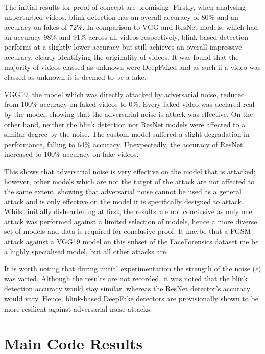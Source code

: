 The initial results for proof of concept are promising. Firstly, when analysing unperturbed videos, blink detection has an overall accuracy of 80\% and an accuracy on fakes of 72\%. In comparison to VGG and ResNet models, which had an accuracy 98\% and 91\% across all videos respectively, blink-based detection performs at a slightly lower accuracy but still achieves an overall impressive accuracy, clearly identifying the originality of videos. It was found that the majority of videos classed as unknown were DeepFaked and as such if a video was classed as unknown it is deemed to be a fake.

VGG19, the model which was directly attacked by adversarial noise, reduced from 100\% accuracy on faked videos to 0\%. Every faked video was declared real by the model, showing that the adversarial noise is attack was effective. On the other hand, neither the blink detection nor ResNet models were affected to a similar degree by the noise. The custom model suffered a slight degradation in performance, falling to 64\% accuracy. Unexpectedly, the accuracy of ResNet increased to 100\% accuracy on fake videos.

This shows that adversarial noise is very effective on the model that is attacked; however, other models which are not the target of the attack are not affected to the same extent, showing that adversarial noise cannot be used as a general attack and is only effective on the model it is specifically designed to attack. Whilst initially disheartening at first, the results are not conclusive as only one attack was performed against a limited selection of models, hence a more diverse set of models and data is required for conclusive proof. It maybe that a FGSM attack against a VGG19 model on this subset of the FaceForensics dataset me be a highly specialised model, but all other attacks are.

It is worth noting that during initial experimentation the strength of the noise ($\epsilon$) was varied. Although the results are not recorded, it was noted that the blink detection accuracy would stay similar, whereas the ResNet detector's accuracy would vary. Hence, blink-based DeepFake detectors are provisionally shown to be more resilient against adversarial noise attacks.

\section{Main Code Results}

